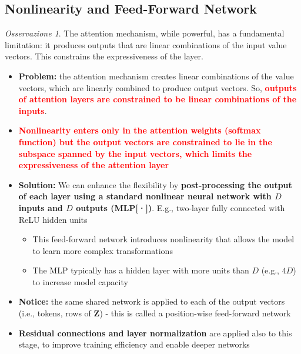 \documentclass[11pt,a4paper]{article}
\theoremstyle{definition}
\theoremstyle{plain}
\theoremstyle{remark}
\newtheorem*{observation}{Osservazione}
\begin{document}
\subsection{Nonlinearity and Feed-Forward Network}

\begin{observation}
The attention mechanism, while powerful, has a fundamental limitation: it produces outputs that are linear combinations of the input value vectors. This constrains the expressiveness of the layer.
\end{observation}

\begin{itemize}
    \item \textbf{Problem:} the attention mechanism creates linear combinations of the value vectors, which are linearly combined to produce output vectors. So, \textcolor{red}{\textbf{outputs of attention layers are constrained to be linear combinations of the inputs}}.
    
    \item \textcolor{red}{\textbf{Nonlinearity enters only in the attention weights (softmax function) but the output vectors are constrained to lie in the subspace spanned by the input vectors, which limits the expressiveness of the attention layer}}
    
    \item \textbf{Solution:} We can enhance the flexibility by \textbf{post-processing the output of each layer using a standard nonlinear neural network with $D$ inputs and $D$ outputs (MLP[·])}. E.g., two-layer fully connected with ReLU hidden units
    
    \begin{itemize}
        \item This feed-forward network introduces nonlinearity that allows the model to learn more complex transformations
        \item The MLP typically has a hidden layer with more units than $D$ (e.g., $4D$) to increase model capacity
    \end{itemize}
    
    \item \textbf{Notice:} the same shared network is applied to each of the output vectors (i.e., tokens, rows of $\mathbf{Z}$) - this is called a position-wise feed-forward network
    
    \item \textbf{Residual connections and layer normalization} are applied also to this stage, to improve training efficiency and enable deeper networks
\end{itemize}
\end{document}
